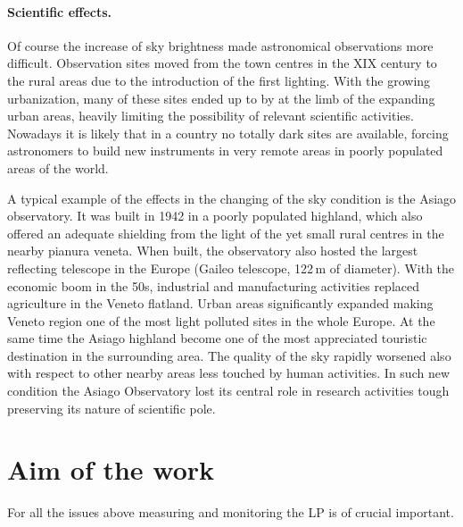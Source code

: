 \documentclass[a4paper, titlepage, 10pt]{book}
\begin{document}
\paragraph{Scientific effects.} Of course the increase of sky brightness made astronomical observations more difficult. Observation sites moved from the town centres in the XIX century to the rural areas due to the introduction of the first lighting. With the growing urbanization, many of these sites ended up to by at the limb of the expanding urban areas, heavily limiting the possibility of relevant scientific activities. Nowadays it is likely that in a country no totally dark sites are available, forcing astronomers to build new instruments in very remote areas in poorly populated areas of the world.

A typical example of the effects in the changing of the sky condition is the Asiago observatory. It was built in 1942 in a poorly populated highland, which also offered an adequate shielding from the light of the yet small rural centres in the nearby pianura veneta. When built, the observatory also hosted the largest reflecting telescope in the Europe (Gaileo telescope, 122\,m of diameter).
With the economic boom in the 50s, industrial and manufacturing activities replaced agriculture in the Veneto flatland. Urban areas significantly expanded making Veneto region one of the most light polluted sites in the whole Europe. At the same time the Asiago highland become one of the most appreciated touristic destination in the surrounding area. The quality of the sky rapidly worsened also with respect to other nearby areas less touched by human activities. In such new condition the Asiago Observatory lost its central role in research activities tough preserving its nature of scientific pole.

\section{Aim of the work}
For all the issues above measuring and monitoring the LP is of crucial important. 
\end{document}
